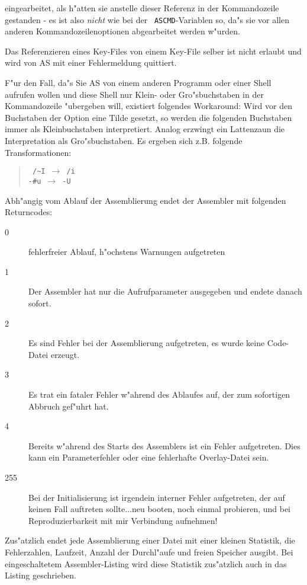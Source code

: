 \documentclass[12pt,a4paper,twoside]{report}
\begin{document}
eingearbeitet, als h"atten sie anstelle dieser Referenz in der
Kommandozeile gestanden - es ist also {\em nicht} wie bei der {\tt
ASCMD}-Variablen so, da"s sie vor allen anderen Kommandozeilenoptionen
abgearbeitet werden w"urden.
\par
Das Referenzieren eines Key-Files von einem Key-File selber ist nicht
erlaubt und wird von AS mit einer Fehlermeldung quittiert.
\par
F"ur den Fall, da"s Sie AS von einem anderen Programm oder einer Shell
aufrufen wollen und diese Shell nur Klein- oder Gro"sbuchstaben in der
Kommandozeile "ubergeben will, existiert folgendes Workaround: Wird vor
den Buchstaben der Option eine Tilde gesetzt, so werden die folgenden
Buchstaben immer als Kleinbuchstaben interpretiert.  Analog erzwingt
ein Lattenzaun die Interpretation als Gro"sbuchstaben.  Es ergeben
sich z.B. folgende Transformationen:
\begin{quote}{\tt
 /\verb!~!I $\longrightarrow$ /i \\
 -\verb!#!u $\longrightarrow$ -U}
\end{quote}
\par
Abh"angig vom Ablauf der Assemblierung endet der Assembler mit
folgenden Returncodes:
\begin{description}
\item[0]{fehlerfreier Ablauf, h"ochstens Warnungen aufgetreten}
\item[1]{Der Assembler hat nur die Aufrufparameter ausgegeben und
         endete danach sofort.}
\item[2]{Es sind Fehler bei der Assemblierung aufgetreten, es wurde
         keine Code-Datei erzeugt.}
\item[3]{Es trat ein fataler Fehler w"ahrend des Ablaufes auf, der
         zum sofortigen Abbruch gef"uhrt hat.}
\item[4]{Bereits w"ahrend des Starts des Assemblers ist ein Fehler
         aufgetreten.  Dies kann ein Parameterfehler oder eine fehlerhafte
         Overlay-Datei sein.}
\item[255]{Bei der Initialisierung ist irgendein interner Fehler
         aufgetreten, der auf keinen Fall auftreten sollte...neu booten,
         noch einmal probieren, und bei Reproduzierbarkeit mit mir
         Verbindung aufnehmen!}
\end{description}

Zus"atzlich endet jede Assemblierung einer Datei mit einer kleinen
Statistik, die Fehlerzahlen, Laufzeit, Anzahl der Durchl"aufe und freien
Speicher ausgibt.  Bei eingeschaltetem Assembler-Listing wird diese
Statistik zus"atzlich auch in das Listing geschrieben.
\end{document}
